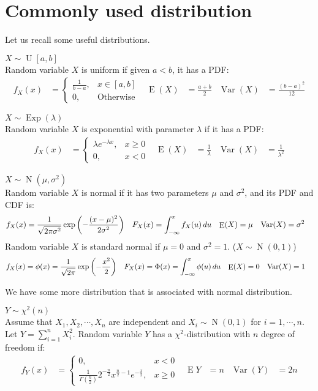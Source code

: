 \documentclass{huhtakm-template-book-v2}
\DeclareMathOperator{\E}{E}
\DeclareMathOperator{\Var}{Var}
\DeclareMathOperator{\Exp}{Exp}
\DeclareMathOperator{\N}{N}
\DeclareMathOperator{\U}{U}
\begin{document}
\section{Commonly used distribution}
Let us recall some useful distributions.
\begin{eg} $X\sim\U[a,b]$\\
	Random variable $X$ is uniform if given $a<b$, it has a PDF:
	\begin{align*}
		f_{X}(x)&=\begin{cases}
			\frac{1}{b-a}, &x\in[a,b]\\
			0, &\text{Otherwise}
		\end{cases} & \E(X)&=\frac{a+b}{2} & \Var(X)&=\frac{(b-a)^{2}}{12}
	\end{align*}
\end{eg}
\begin{eg} $X\sim\Exp(\lambda)$\\
	Random variable $X$ is exponential with parameter $\lambda$ if it has a PDF:
	\begin{align*}
		f_{X}(x)&=\begin{cases}
			\lambda e^{-\lambda x}, &x\geq 0\\
			0, &x<0
		\end{cases} & \E(X)&=\frac{1}{\lambda} & \Var(X)&=\frac{1}{\lambda^{2}}
	\end{align*}
\end{eg}
\begin{eg} $X\sim\N(\mu,\sigma^{2})$\\
	Random variable $X$ is normal if it has two parameters $\mu$ and $\sigma^{2}$, and its PDF and CDF is:
	\begin{align*}
		f_{X}(x)&=\frac{1}{\sqrt{2\pi\sigma^{2}}}\exp\left(-\frac{(x-\mu)^{2}}{2\sigma^{2}}\right) & F_{X}(x)&=\intlu{-\infty}{x}f_{X}(u)\,du & \E(X)&=\mu & \Var(X)&=\sigma^{2}
	\end{align*}
	Random variable $X$ is standard normal if $\mu=0$ and $\sigma^{2}=1$. ($X\sim\N(0,1)$)
	\begin{align*}
		f_{X}(x)&=\phi(x)=\frac{1}{\sqrt{2\pi}}\exp\left(-\frac{x^{2}}{2}\right) & F_{X}(x)&=\Phi(x)=\intlu{-\infty}{x}\phi(u)\,du & \E(X)&=0 & \Var(X)&=1
	\end{align*}
\end{eg}
We have some more distribution that is associated with normal distribution.
\begin{eg} $Y\sim\chi^{2}(n)$\\
	Assume that $X_{1},X_{2},\cdots,X_{n}$ are independent and $X_{i}\sim\N(0,1)$ for $i=1,\cdots,n$. Let $Y=\sum_{i=1}^{n}X_{i}^{2}$. Random variable $Y$ has a $\chi^{2}$-distribution with $n$ degree of freedom if:
	\begin{align*}
		f_{Y}(x)&=\begin{cases}
			0, &x<0\\
			\frac{1}{\Gamma(\frac{n}{2})}2^{-\frac{n}{2}}x^{\frac{n}{2}-1}e^{-\frac{x}{2}}, &x\geq 0
		\end{cases} & \E{Y}&=n & \Var(Y)&=2n
	\end{align*}
\end{eg} 
\end{document}
